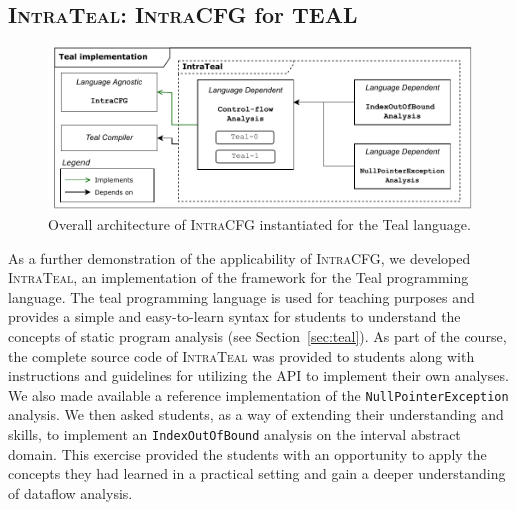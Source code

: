 \subsection{\textsc{IntraTeal}: \textsc{IntraCFG} for TEAL}
\begin{figure}[H]
    \centering
    \includegraphics[scale=0.65]{kappa/img/architectureteal.pdf}
    \caption{\label{fig:IntraTeal} Overall architecture of \textsc{IntraCFG} instantiated for the Teal language.}
\end{figure}
As a further demonstration of the applicability of \textsc{IntraCFG},
we developed \textsc{IntraTeal}, an implementation of the framework for the Teal programming language.
The teal programming language is used for teaching purposes
and provides a simple and easy-to-learn syntax for students to understand the
concepts of static program analysis (see Section~\ref{sec:teal}).
As part of the course, the complete source code of \textsc{IntraTeal} was provided to students along with
instructions and guidelines for utilizing the API to implement their own analyses.
We also made available a reference implementation of the
\texttt{NullPointerException} analysis. We then asked students, as a way of
extending their understanding and skills, to implement an \texttt{IndexOutOfBound}
analysis on the interval abstract domain. This exercise provided the
students with an opportunity to apply the concepts they had learned in a practical
setting and gain a deeper understanding of dataflow analysis.

